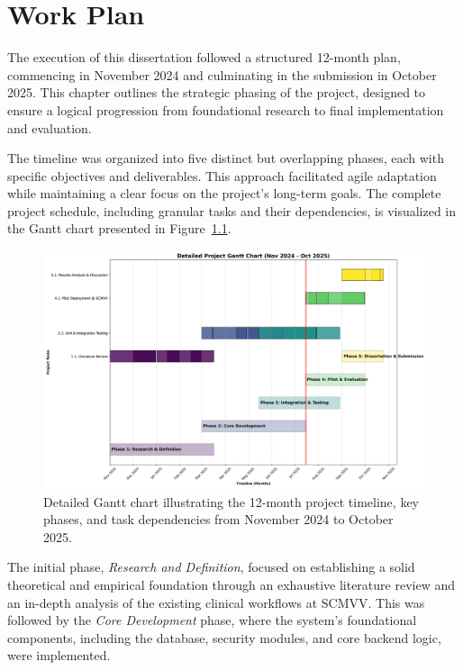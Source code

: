 \chapter{Work Plan}
\label{chap:WorkPlan}

The execution of this dissertation followed a structured 12-month plan, commencing in November 2024 and culminating in the submission in October 2025. This chapter outlines the strategic phasing of the project, designed to ensure a logical progression from foundational research to final implementation and evaluation.

The timeline was organized into five distinct but overlapping phases, each with specific objectives and deliverables. This approach facilitated agile adaptation while maintaining a clear focus on the project's long-term goals. The complete project schedule, including granular tasks and their dependencies, is visualized in the Gantt chart presented in Figure~\ref{fig:gantt_chart_detailed}.

\begin{figure}[htbp]
    \centering
    \includegraphics[width=\textwidth]{images/generated/gantt_chart_detailed.png}
    \caption{Detailed Gantt chart illustrating the 12-month project timeline, key phases, and task dependencies from November 2024 to October 2025.}
    \label{fig:gantt_chart_detailed}
\end{figure}

The initial phase, \textit{Research and Definition}, focused on establishing a solid theoretical and empirical foundation through an exhaustive literature review and an in-depth analysis of the existing clinical workflows at SCMVV. This was followed by the \textit{Core Development} phase, where the system's foundational components, including the database, security modules, and core backend logic, were implemented.

